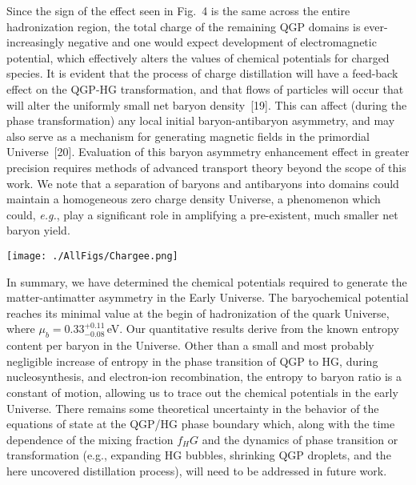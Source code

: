 \begin{mdframed}[linecolor=gray,roundcorner=12pt,backgroundcolor=Dandelion!15,linewidth=1pt,leftmargin=0cm,rightmargin=0cm,topline=true,bottomline=true,skipabove=12pt]
Since the sign of the effect seen in Fig.~4 is the same across the entire hadronization region, the total charge of the remaining QGP domains is ever-increasingly negative and one would expect development of electromagnetic potential, which effectively alters the values of chemical potentials for charged species. It is evident  that the process of charge distillation will have a feed-back effect on the QGP-HG transformation, and that flows of particles will occur that will alter the uniformly small net baryon density~[19]. This can affect (during the phase transformation) any local initial baryon-antibaryon asymmetry, and may also serve as a mechanism for generating magnetic fields in the primordial Universe~[20]. Evaluation of this baryon asymmetry enhancement effect in greater precision  requires  methods of advanced transport theory beyond the scope of this work. We note that a  separation of baryons and antibaryons into domains could maintain a homogeneous zero charge density Universe, a phenomenon which could, {\it e.g.}, play a significant role in amplifying a pre-existent, much smaller net baryon yield.   

\centerline{\texttt{[image: ./AllFigs/Chargee.png]}}

In summary, we have determined the chemical potentials required to generate the matter-antimatter asymmetry in the Early Universe. The baryochemical potential reaches its minimal value at the begin of  hadronization of the quark Universe, where $\mu_b=0.33^{+0.11}_{-0.08}$\,eV. Our quantitative results derive from the known entropy content per baryon in the Universe. Other than a  small and most probably negligible increase of entropy in the phase transition of QGP to HG, during nucleosynthesis, and electron-ion recombination, the entropy to baryon ratio is a constant of motion, allowing us to trace out the chemical potentials in the early Universe. There remains some theoretical uncertainty in the behavior of the equations of state at the QGP/HG phase boundary which, along with the time dependence of the mixing fraction $f_HG$ and the dynamics of phase transition or transformation (e.g., expanding HG bubbles, shrinking QGP droplets, and the here uncovered distillation process), will need to be addressed in future work.
 

\end{mdframed}
